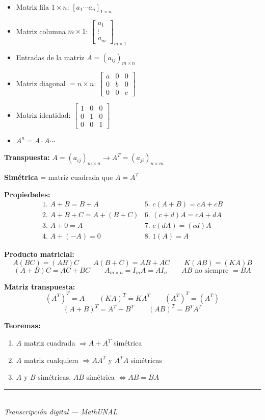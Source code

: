 \documentclass[11pt]{article}
\newcommand{\examfooter}{%
  \vfill
  \rule{\linewidth}{0.4pt}\\[1pt]
  {\scriptsize\textit{Transcripción digital --- MathUNAL}\hfill\textcolor{unalblue}{\textbf{\thepage}}}
}
\begin{document}
\vspace{0.3cm}
\begin{itemize}[leftmargin=1.2em]
\item Matriz fila $1\times n$: $[a_1 \cdots a_n]_{1\times n}$
\item Matriz columna $m\times 1$: $\begin{bmatrix}a_1\\\vdots\\a_m\end{bmatrix}_{m\times 1}$
\item Entradas de la matriz $A = (a_{ij})_{m\times n}$
\item Matriz diagonal $= n\times n$: $\begin{bmatrix}a&0&0\\0&b&0\\0&0&c\end{bmatrix}$
\item Matriz identidad: $\begin{bmatrix}1&0&0\\0&1&0\\0&0&1\end{bmatrix}$
\item $A^n = A \cdot A \cdots$
\end{itemize}

\vspace{0.2cm}
{\bfseries\color{purple1} Transpuesta:} $A = (a_{ij})_{m\times n} \to A^T = (a_{ji})_{n\times m}$

\vspace{0.1cm}
{\bfseries\color{purple1} Simétrica} = matriz cuadrada que $A = A^T$

\vspace{0.2cm}
\textbf{Propiedades:}
\[
\begin{array}{ll}
\text{1. } A+B = B+A & \text{5. } c(A+B) = cA+cB \\
\text{2. } A+B+C = A+(B+C) & \text{6. } (c+d)A = cA+dA \\
\text{3. } A+0 = A & \text{7. } c(dA) = (cd)A \\
\text{4. } A+(-A) = 0 & \text{8. } 1(A) = A
\end{array}
\]

\vspace{0.2cm}
{\bfseries\color{magenta1} Producto matricial:}
\[
A(BC) = (AB)C \qquad A(B+C) = AB+AC \qquad K(AB) = (KA)B
\]
\[
(A+B)C = AC+BC \qquad A_{m\times n} = I_m A = A I_n \qquad AB \text{ no siempre } = BA
\]

\vspace{0.2cm}
{\bfseries\color{magenta1} Matriz transpuesta:}
\[
(A^T)^T = A \qquad (KA)^T = KA^T \qquad (A^T)^T = (A^T)
\]
\[
(A+B)^T = A^T+B^T \qquad (AB)^T = B^TA^T
\]

\vspace{0.2cm}
{\bfseries\color{purple1} Teoremas:}
\begin{enumerate}
\item $A$ matriz cuadrada $\Rightarrow A+A^T$ simétrica
\item $A$ matriz cualquiera $\Rightarrow AA^T$ y $A^TA$ simétricas
\item $A$ y $B$ simétricas, $AB$ simétrica $\iff AB=BA$
\end{enumerate}

\examfooter
\end{document}
